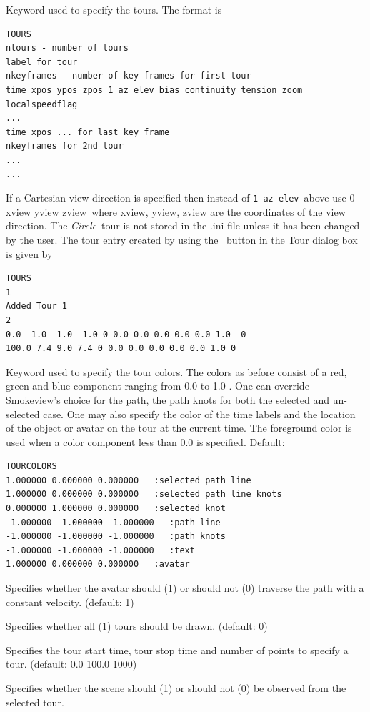 \documentclass[11pt,twoside]{book}
\newcommand{\frameit}[1]{\fbox{\tt #1}}
\newcommand{\hitem}[1]{\item[{\bf #1} \hfill]}
\begin{document}
\hitem{TOURS}Keyword used to specify the tours. The format is
\begin{lstlisting}
TOURS
ntours - number of tours
label for tour
nkeyframes - number of key frames for first tour
time xpos ypos zpos 1 az elev bias continuity tension zoom localspeedflag
...
time xpos ... for last key frame
nkeyframes for 2nd tour
...
...
\end{lstlisting}
If a Cartesian view direction is specified then instead of {\tt 1
az elev}\ above use {0 xview yview zview}\ where xview, yview, zview
are the coordinates of the view direction. The {\em Circle}\ tour
is not stored in the .ini file unless it has been changed by the
user.  The tour entry created by using the \frameit{Add}\ button
in the Tour dialog box is given by
\begin{lstlisting}
TOURS
1
Added Tour 1
2
0.0 -1.0 -1.0 -1.0 0 0.0 0.0 0.0 0.0 0.0 1.0  0
100.0 7.4 9.0 7.4 0 0.0 0.0 0.0 0.0 0.0 1.0 0
\end{lstlisting}

\hitem{TOURCOLORS}Keyword used to specify the tour colors.  The colors as before
consist of a red, green and blue component ranging from 0.0 to 1.0 .  One can override
Smokeview's choice for the path, the path knots for both the selected and un-selected
case.  One may also specify the color of the time labels and the location of the
object or avatar on the tour at the current time. The foreground color is used when a
color component less than 0.0 is specified.
Default:

\begin{lstlisting}
TOURCOLORS
1.000000 0.000000 0.000000   :selected path line
1.000000 0.000000 0.000000   :selected path line knots
0.000000 1.000000 0.000000   :selected knot
-1.000000 -1.000000 -1.000000   :path line
-1.000000 -1.000000 -1.000000   :path knots
-1.000000 -1.000000 -1.000000   :text
1.000000 0.000000 0.000000   :avatar
\end{lstlisting}
\hitem{TOURCONSTANTVEL}Specifies whether the avatar should (1) or
should not (0) traverse the path with a constant velocity.
(default: 1)

\hitem{VIEWALLTOURS}Specifies whether all (1) tours should be
drawn. (default: 0)

\hitem{VIEWTIMES}Specifies the tour start time, tour stop time and
number of points to specify a tour. (default: 0.0 100.0 1000)

\hitem{VIEWTOURFROM}Specifies whether the scene should (1) or
should not (0) be observed from the selected tour.
\end{document}
